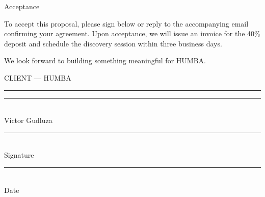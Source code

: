 \documentclass[a4paper,11pt]{article}
\newcommand{\sectionnum}[1]{%
  \tikz[baseline=(char.base)]{
    \node[fill=hblack, text=hcream, circle, inner sep=0pt, minimum size=20pt, font=\latosemibold\fontsize{9pt}{9pt}\selectfont] (char) {#1};
  }%
}
\begin{document}
\vspace{16pt}
{\fontsize{15pt}{15pt}\selectfont\latosemibold\color{hblack}\sectionnum{17}\;\;Acceptance}

\vspace{8pt}
{\color{textbody}\fontsize{10.5pt}{16pt}\selectfont
To accept this proposal, please sign below or reply to the accompanying email confirming your agreement. Upon acceptance, we will issue an invoice for the 40\% deposit and schedule the discovery session within three business days.

We look forward to building something meaningful for HUMBA\texttrademark.}

\vspace{20pt}
\begin{minipage}[t]{0.46\textwidth}
\begin{tcolorbox}[colback=graybg!40, colframe=grayline, boxrule=0.5pt, arc=3pt, left=5mm, right=5mm, top=5mm, bottom=5mm]
{\color{hblack}\latosemibold\fontsize{8.5pt}{8.5pt}\selectfont{}CLIENT --- HUMBA\texttrademark}\\[2pt]
\textcolor{holive}{\rule{\linewidth}{1.5pt}}

\vspace{28pt}
\textcolor{grayline}{\rule{\linewidth}{0.5pt}}\\[2pt]
{\color{textlight}\latolight\fontsize{7.5pt}{7.5pt}\selectfont Victor Gudluza}

\vspace{28pt}
\textcolor{grayline}{\rule{\linewidth}{0.5pt}}\\[2pt]
{\color{textlight}\latolight\fontsize{7.5pt}{7.5pt}\selectfont Signature}

\vspace{28pt}
\textcolor{grayline}{\rule{\linewidth}{0.5pt}}\\[2pt]
{\color{textlight}\latolight\fontsize{7.5pt}{7.5pt}\selectfont Date}
\end{tcolorbox}
\end{minipage}%
\hfill
\end{document}
